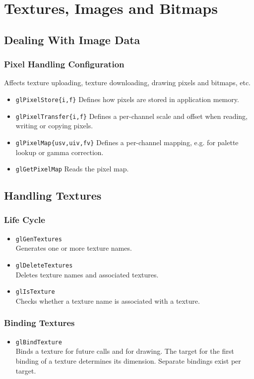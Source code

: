 \documentclass[12pt]{article}
\begin{document}
\section{Textures, Images and Bitmaps}



\subsection{Dealing With Image Data}

\subsubsection{Pixel Handling Configuration}
Affects texture uploading, texture downloading, drawing pixels and bitmaps, etc. 
\begin{itemize}
\item \texttt{glPixelStore\{i,f\}}
	Defines how pixels are stored in application memory.
\item \texttt{glPixelTransfer\{i,f\}}
	Defines a per-channel scale and offset when reading, writing or copying pixels.
\item \texttt{glPixelMap\{usv,uiv,fv\}}
	Defines a per-channel mapping, e.g. for palette lookup or gamma correction.
\item \texttt{glGetPixelMap}
	Reads the pixel map.
\end{itemize}



\subsection{Handling Textures}

\subsubsection{Life Cycle}
\begin{itemize}
\item \texttt{glGenTextures} \\
	Generates one or more texture names.
\item \texttt{glDeleteTextures} \\
	Deletes texture names and associated textures.
\item \texttt{glIsTexture} \\
	Checks whether a texture name is associated with a texture.
\end{itemize}

\subsubsection{Binding Textures}
\begin{itemize}
\item \texttt{glBindTexture} \\
	Binds a texture for future calls and for drawing. The target for the first binding of a texture determines its dimension.
	Separate bindings exist per target.
\end{itemize}
\end{document}
